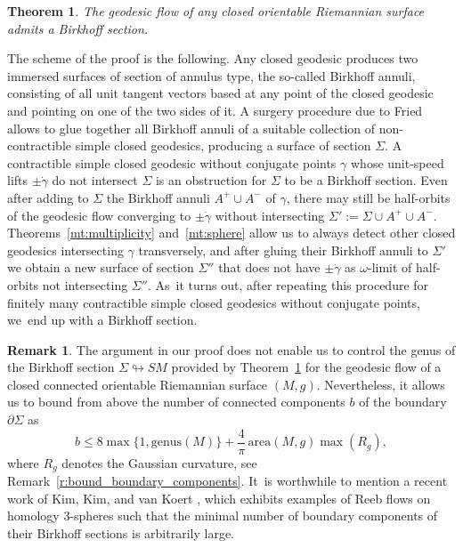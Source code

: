 \documentclass[11pt]{article}
\newcommand{\area}{\mathrm{area}}
\theoremstyle{plain}
\newtheorem{MainThm}{Theorem}
\theoremstyle{definition}
\newtheorem{Remark}[Thm]{Remark}
\begin{document}
\begin{MainThm}\label{mt:Birkhoff_sections}
The geodesic flow of any closed orientable Riemannian surface admits a Birkhoff section.
\end{MainThm}

The scheme of the proof is the following. Any closed geodesic produces two immersed surfaces of section of annulus type, the so-called Birkhoff annuli, consisting of all unit tangent vectors based at any point of the closed geodesic and pointing on one of the two sides of it. A surgery procedure due to Fried \cite{Fried:1983aa} allows to glue together all Birkhoff annuli of a suitable collection of non-contractible simple closed geodesics, producing a surface of section $\Sigma$. A contractible simple closed geodesic without conjugate points $\gamma$ whose unit-speed lifts $\pm\dot\gamma$ do not intersect $\Sigma$ is an obstruction for $\Sigma$ to be a Birkhoff section. Even after adding to $\Sigma$ the Birkhoff annuli $A^+\cup A^-$ of $\gamma$, there may still be half-orbits of the geodesic flow converging to $\pm\dot\gamma$ without intersecting $\Sigma':=\Sigma\cup A^+\cup A^-$. Theorems~\ref{mt:multiplicity} and~\ref{mt:sphere} allow us to always detect other closed geodesics intersecting $\gamma$ transversely, and after gluing their Birkhoff annuli to $\Sigma'$ we obtain a new surface of section $\Sigma''$ that does not have $\pm\dot\gamma$ as $\omega$-limit of half-orbits not intersecting $\Sigma''$. As~it turns out, after repeating this procedure for finitely many contractible simple closed geodesics without conjugate points, we~end up with a Birkhoff section.

\begin{Remark}
The argument in our proof does not enable us to control the genus of the Birkhoff section $\Sigma\looparrowright SM$ provided by Theorem~\ref{mt:Birkhoff_sections} for the geodesic flow of a closed connected orientable Riemannian surface $(M,g)$. Nevertheless, it allows us to bound from above the number of connected components $b$ of the boundary $\partial\Sigma$ as
\[
 b\leq 8\max\big\{1,\mathrm{genus}(M)\big\}+\frac{4}{\pi}\,\area(M,g)\max(R_g),
\]
where $R_g$ denotes the Gaussian curvature, see Remark~\ref{r:bound_boundary_components}. It~is worthwhile to mention a recent work of Kim, Kim, and van Koert \cite{Kim:2022aa}, which exhibits examples of Reeb flows on homology 3-spheres such that the minimal number of boundary components of their Birkhoff sections is arbitrarily large.
\end{Remark}
\end{document}
